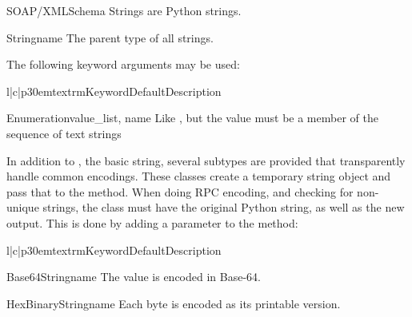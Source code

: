 SOAP/XMLSchema Strings are Python strings.

\begin{classdesc}{String}{name}
The parent type of all strings.

The following keyword arguments may be used:

\begin{tableiii}{l|c|p{30em}}{textrm}{Keyword}{Default}{Description}
\end{tableiii}
\end{classdesc}

\begin{classdesc}{Enumeration}{value_list, name}
Like , but the value must be a member of
the  sequence of text strings
\end{classdesc}

In addition to ,
the basic string, several subtypes are provided that transparently
handle common encodings.
These classes create a temporary string object and pass that to
the  method.
When doing RPC encoding, and checking for non-unique strings, the
 class must have the original Python string, as well
as the new output.
This is done by adding a parameter to the  method:

\begin{tableiii}{l|c|p{30em}}{textrm}{Keyword}{Default}{Description}
\end{tableiii}

\begin{classdesc}{Base64String}{name}
The value is encoded in Base-64.
\end{classdesc}

\begin{classdesc}{HexBinaryString}{name}
Each byte is encoded as its printable version.
\end{classdesc}

